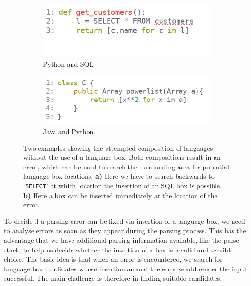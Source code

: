 \documentclass[sigplan,screen]{acmart}\settopmatter{printfolios=true,printccs=false,printacmref=false}
\begin{document}
\begin{figure}
    \begin{subfigure}{0.4\textwidth}
    \includegraphics[width=1\textwidth]{images/heuristic1.png}
    \caption{Python and SQL}
  \end{subfigure}
  \begin{subfigure}{0.4\textwidth}
    \includegraphics[width=1\textwidth]{images/heuristic2.png}
    \caption{Java and Python}
  \end{subfigure}
\caption{Two examples showing the attempted composition of languages without the
use of a language box. Both compositions result in an error, which can be used
to search the surrounding area for potential language box locations. \textbf{a)}
Here we have to search backwards to `\texttt{SELECT}' at which location the
insertion of an SQL box is possible. \textbf{b)} Here a box can be inserted
immediately at the location of the error.}
\label{fig_heuristic_example}
\end{figure}

To decide if a parsing error can be fixed via insertion of a language box, we
need to analyse errors as soon as they appear during the parsing process. This
has the advantage that we have additional parsing information available, like
the parse stack, to help us decide whether the insertion of a box is a valid
and sensible choice. The basic idea is
that when an error is encountered, we search for language box candidates whose
insertion around the error would render the input successful. The main
challenge is therefore in finding suitable candidates.
\end{document}
